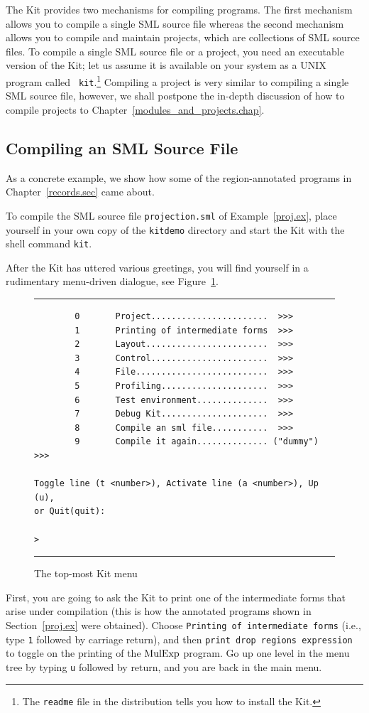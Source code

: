 \documentclass[12pt]{book}
\begin{document}
The Kit provides two mechanisms for compiling programs. The first
mechanism allows you to compile a single SML source file whereas the
second mechanism allows you to compile and maintain projects, which
are collections of SML source files. To compile a single SML source
file or a project, you need an executable version of the Kit; let us
assume it is available on your system as a UNIX program called {\tt
  kit}.\footnote{The {\tt readme} file in the distribution tells you
  how to install the Kit.} Compiling a project is very similar to
compiling a single SML source file, however, we shall postpone the in-depth
discussion of how to compile projects to
Chapter~\ref{modules_and_projects.chap}.

\subsection{Compiling an SML Source File}
As a concrete example, we show how some of the region-annotated programs in
Chapter~\ref{records.sec} came about.

To compile the SML source file {\tt projection.sml} of
Example~\ref{proj.ex}, place yourself in your own copy of the {\tt kitdemo} directory
and start the Kit with the shell
command {\tt kit}.

After the Kit has uttered various greetings, you will find yourself in
a rudimentary menu-driven dialogue, see Figure~\ref{dialogue.fig}.
\begin{figure}
\hrule \medskip
\begin{verbatim}
        0       Project.......................  >>>
        1       Printing of intermediate forms  >>>
        2       Layout........................  >>>
        3       Control.......................  >>>
        4       File..........................  >>>
        5       Profiling.....................  >>>
        6       Test environment..............  >>>
        7       Debug Kit.....................  >>>
        8       Compile an sml file...........  >>>
        9       Compile it again.............. ("dummy") >>>

Toggle line (t <number>), Activate line (a <number>), Up (u), 
or Quit(quit): 

>
\end{verbatim}
\caption{The top-most Kit menu}
\medskip \hrule 
\label{dialogue.fig}
\end{figure}
First, you are going to ask the Kit to print one of the intermediate
forms that arise under compilation (this is how the annotated programs
shown in  Section~\ref{proj.ex} were obtained). 
Choose \texttt{Printing of intermediate forms} (i.e., type \texttt{1}
followed by carriage return), and then \texttt{print drop regions
expression} to toggle on the printing of the $\hbox{\rm MulExp}$ program.
Go up one level in the menu tree by typing \texttt{u} followed by return,
and you are back in the main menu.
\end{document}
